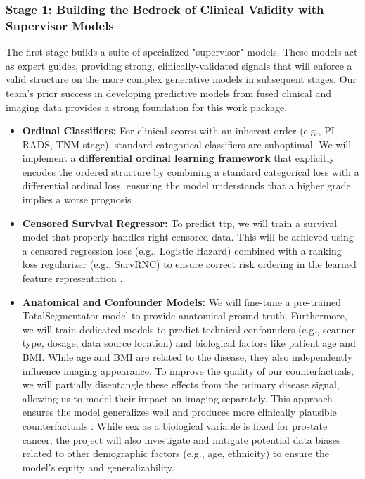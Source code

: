 \documentclass[11pt, a4paper]{article}
\begin{document}
\subsubsection{Stage 1: Building the Bedrock of Clinical Validity with Supervisor Models}
The first stage builds a suite of specialized "supervisor" models. These models act as expert guides, providing strong, clinically-validated signals that will enforce a valid structure on the more complex generative models in subsequent stages. Our team's prior success in developing predictive models from fused clinical and imaging data provides a strong foundation for this work package.
\begin{itemize}
    \item \textbf{Ordinal Classifiers:} For clinical scores with an inherent order (e.g., PI-RADS, TNM stage), standard categorical classifiers are suboptimal. We will implement a \textbf{differential ordinal learning framework} that explicitly encodes the ordered structure by combining a standard categorical loss with a differential ordinal loss, ensuring the model understands that a higher grade implies a worse prognosis \cite{LeeByeon2025, GrisiKartasalo2025}.
    \item \textbf{Censored Survival Regressor:} To predict \gls{ttp}, we will train a survival model that properly handles right-censored data. This will be achieved using a censored regression loss (e.g., Logistic Hazard) combined with a ranking loss regularizer (e.g., SurvRNC) to ensure correct risk ordering in the learned feature representation \cite{GaoLi2019, RivailVogl2023, SaeedRidzuan2024}.
    \item \textbf{Anatomical and Confounder Models:} We will fine-tune a pre-trained TotalSegmentator model \cite{Wasserthal_2023} to provide anatomical ground truth. Furthermore, we will train dedicated models to predict technical confounders (e.g., scanner type, dosage, data source location) and biological factors like patient age and BMI. While age and BMI are related to the disease, they also independently influence imaging appearance. To improve the quality of our counterfactuals, we will partially disentangle these effects from the primary disease signal, allowing us to model their impact on imaging separately. This approach ensures the model generalizes well and produces more clinically plausible counterfactuals \cite{PuglisiAlexander2025, ZhangHager2025}. While sex as a biological variable is fixed for prostate cancer, the project will also investigate and mitigate potential data biases related to other demographic factors (e.g., age, ethnicity) to ensure the model's equity and generalizability.
\end{itemize}
\end{document}
